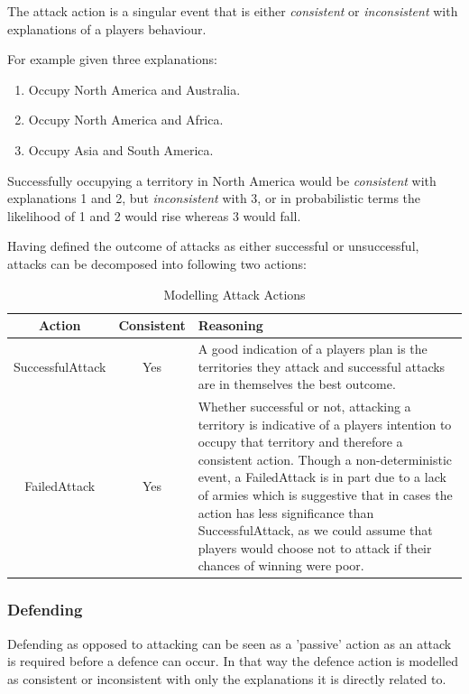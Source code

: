 \documentclass[parskip]{cs4rep}
\begin{document}
The attack action is a singular event that is either \textit{consistent} or \textit{inconsistent} with explanations of a players behaviour. 

For example given three explanations:

\begin{enumerate}
\item
Occupy North America and Australia.
\item
Occupy North America and Africa.
\item
Occupy Asia and South America.
\end{enumerate}

Successfully occupying a territory in North America would be \textit{consistent} with explanations 1 and 2, but \textit{inconsistent} with 3, or in probabilistic terms the likelihood of 1 and 2 would rise whereas 3 would fall.

Having defined the outcome of attacks as either successful or unsuccessful, attacks can be decomposed into following two actions: 

\begin{table}[ht]
\centering
\begin{tabular}{|c|c|p{8cm}|}
\hline 
\textbf{Action} & \textbf{Consistent}  & \textbf{Reasoning} \\ 
\hline 
SuccessfulAttack & Yes & A good indication of a players plan is the territories they attack and successful attacks are in themselves the best outcome. \\ 
\hline 
FailedAttack & Yes & Whether successful or not, attacking a territory is indicative of a players intention to occupy that territory and therefore a consistent action. Though a non-deterministic event, a FailedAttack is in part due to a lack of armies which is suggestive that in cases the action has less significance than SuccessfulAttack, as we could assume that players would choose not to attack if their chances of winning were poor.\\ 
\hline
\end{tabular}
\caption{Modelling Attack Actions}
\label{table:attack-modelling}
\end{table}

\newpage

\subsubsection{Defending}

Defending as opposed to attacking can be seen as a 'passive' action as an attack is required before a defence can occur. In that way the defence action is modelled as consistent or inconsistent with only the explanations it is directly related to. 
\end{document}
